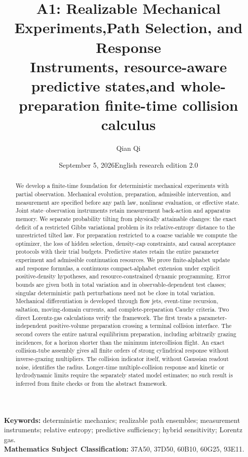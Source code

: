 \documentclass[11pt,a4paper]{article}
\title{\textbf{A1: Realizable Mechanical Experiments,\newline Path Selection, and Response}\\[0.5em]\large Instruments, resource-aware predictive states,\newline and whole-preparation finite-time collision calculus}
\author{Qian Qi}
\date{September 5, 2026\quad English research edition 2.0}
\theoremstyle{definition}
\theoremstyle{remark}\newtheorem{remark}[theorem]{Remark}
\begin{document}
\maketitle
\begin{abstract}
We develop a finite-time foundation for deterministic mechanical experiments with partial observation. Mechanical evolution, preparation, admissible intervention, and measurement are specified before any path law, nonlinear evaluation, or effective state. Joint state--observation instruments retain measurement back-action and apparatus memory. We separate probability tilting from physically attainable changes: the exact deficit of a restricted Gibbs variational problem is its relative-entropy distance to the unrestricted tilted law. For preparation restricted to a coarse variable we compute the optimizer, the loss of hidden selection, density-cap constraints, and causal acceptance protocols with their trial budgets. Predictive states retain the entire parameter experiment and admissible continuation resources. We prove finite-alphabet update and response formulas, a continuous compact-alphabet extension under explicit positive-density hypotheses, and resource-constrained dynamic programming. Error bounds are given both in total variation and in observable-dependent test classes; singular deterministic path perturbations need not be close in total variation. Mechanical differentiation is developed through flow jets, event-time recursion, saltation, moving-domain currents, and complete-preparation Cauchy criteria. Two direct Lorentz-gas calculations verify the framework. The first treats a parameter-independent positive-volume preparation crossing a terminal collision interface. The second covers the entire natural equilibrium preparation, including arbitrarily grazing incidences, for a horizon shorter than the minimum intercollision flight. An exact collision-tube assembly gives all finite orders of strong cylindrical response without inverse-grazing multipliers. The collision indicator itself, without Gaussian readout noise, identifies the radius. Longer-time multiple-collision response and kinetic or hydrodynamic limits require the separately stated model estimates; no such result is inferred from finite checks or from the abstract framework.
\end{abstract}
\noindent\textbf{Keywords:} deterministic mechanics; realizable path ensembles; measurement instruments; relative entropy; predictive sufficiency; hybrid sensitivity; Lorentz gas.\\
\textbf{Mathematics Subject Classification:} 37A50, 37D50, 60B10, 60G25, 93E11.
\end{document}
